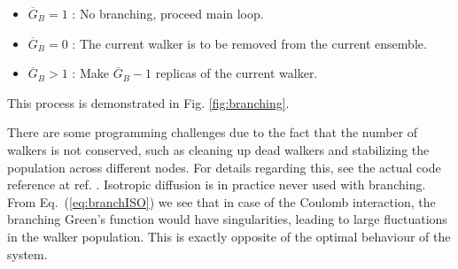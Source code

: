 \begin{itemize}
 \item $\overline{G}_B = 1$ : No branching, proceed main loop.
 \item $\overline{G}_B = 0$ : The current walker is to be removed from the current ensemble.
 \item $\overline{G}_B > 1$ : Make $\overline{G}_B - 1$ replicas of the current walker.
\end{itemize}

This process is demonstrated in Fig. \ref{fig:branching}.

There are some programming challenges due to the fact that the number of walkers is not conserved, such as cleaning up dead walkers and stabilizing the population across different nodes. For details regarding this, see the actual code reference at ref. \cite{libBorealisCode}. Isotropic diffusion is in practice never used with branching. From Eq.~(\ref{eq:branchISO}) we see that in case of the Coulomb interaction, the branching Green's function would have singularities, leading to large fluctuations in the walker population. This is exactly opposite of the optimal behaviour of the system.

